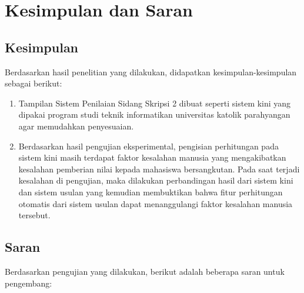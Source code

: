 \chapter{Kesimpulan dan Saran}
\label{chap: kesimpulan}

\section{Kesimpulan}
\label{sec: kesimpulan}
	Berdasarkan hasil penelitian yang dilakukan, didapatkan kesimpulan-kesimpulan sebagai berikut:
	\begin{enumerate}
		\item Tampilan Sistem Penilaian Sidang Skripsi 2 dibuat seperti sistem kini yang dipakai program studi teknik informatikan universitas katolik parahyangan agar memudahkan penyesuaian.
		\item Berdasarkan hasil pengujian eksperimental, pengisian perhitungan pada sistem kini masih terdapat faktor kesalahan manusia yang mengakibatkan kesalahan pemberian nilai kepada mahasiswa bersangkutan. Pada saat terjadi kesalahan di pengujian, maka dilakukan perbandingan hasil dari sistem kini dan sistem usulan yang kemudian membuktikan bahwa fitur perhitungan otomatis dari sistem usulan dapat menanggulangi faktor kesalahan manusia tersebut.
	\end{enumerate}

\section{Saran}
\label{sec: saran}

	Berdasarkan pengujian yang dilakukan, berikut adalah beberapa saran untuk pengembang:
	